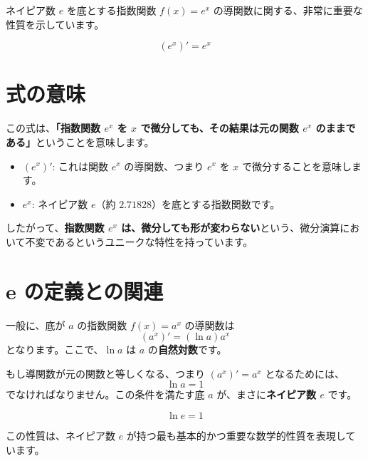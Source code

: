 \documentclass{ltjsarticle}
\begin{document}
ネイピア数 $e$ を底とする指数関数 $f(x) = e^x$ の導関数に関する、非常に重要な性質を示しています。

$$\left(e^x\right)' = e^x$$

\section*{式の意味}

この式は、\textbf{「指数関数 $e^x$ を $x$ で微分しても、その結果は元の関数 $e^x$ のままである」}ということを意味します。

\begin{itemize}
    \item $\left(e^x\right)'$: これは関数 $e^x$ の導関数、つまり $e^x$ を $x$ で微分することを意味します。
    \item $e^x$: ネイピア数 $e$（約 $2.71828$）を底とする指数関数です。
\end{itemize}

したがって、\textbf{指数関数 $e^x$ は、微分しても形が変わらない}という、微分演算において不変であるというユニークな特性を持っています。

\section*{e の定義との関連}

一般に、底が $a$ の指数関数 $f(x) = a^x$ の導関数は
$$(a^x)' = (\ln a) a^x$$
となります。ここで、$\ln a$ は $a$ の\textbf{自然対数}です。

もし導関数が元の関数と等しくなる、つまり $\left(a^x\right)' = a^x$ となるためには、
$$\ln a = 1$$
でなければなりません。この条件を満たす底 $a$ が、まさに\textbf{ネイピア数 $e$} です。

$$\ln e = 1$$

この性質は、ネイピア数 $e$ が持つ最も基本的かつ重要な数学的性質を表現しています。
\end{document}
